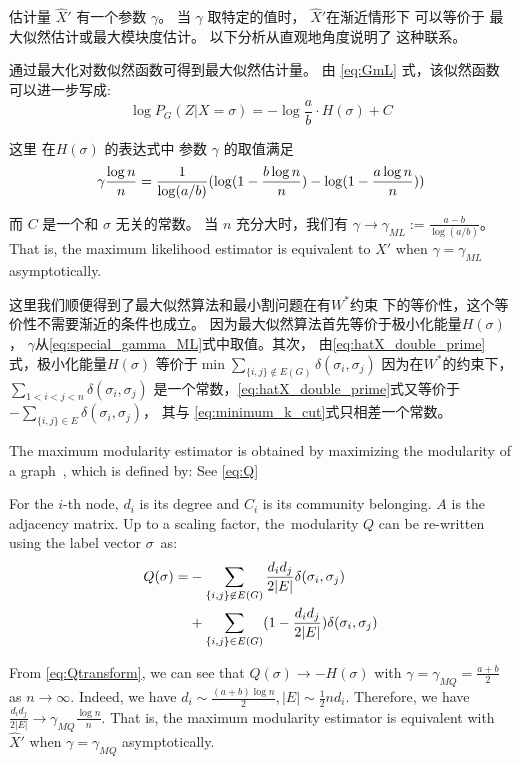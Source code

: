 估计量 $\hat{X}'$ 有一个参数 $\gamma$。
当 $\gamma$ 取特定的值时， $\hat{X}'$在渐近情形下
可以等价于 最大似然估计或最大模块度估计。
以下分析从直观地角度说明了
这种联系。

通过最大化对数似然函数可得到最大似然估计量。
由 \eqref{eq:GmL} 式，该似然函数可以进一步写成:
\begin{equation}\label{eq:PG_energy}
	\log P_G(Z|X=\sigma) = -\log\frac{a}{b} \cdot H(\sigma) + C
\end{equation}

这里 在$H(\sigma)$ 的表达式中 参数 $\gamma$ 的取值满足
\begin{equation}\label{eq:special_gamma_ML}
	\gamma \frac{\log n}{n} = \frac{1}{\log(a/b)}(\log (1-\frac{b \log n}{n}) - \log (1-\frac{a \log n}{n}))	 
\end{equation}

而 $C$ 是一个和 $\sigma$ 无关的常数。
当 $n$ 充分大时，我们有 $\gamma \to \gamma_{ML} := \frac{a-b}{\log(a/b)}$。   
That is, the  maximum likelihood estimator is equivalent to $\hat{X}'$ when $\gamma = \gamma_{ML}$ asymptotically.

这里我们顺便得到了最大似然算法和最小割问题在有$W^*$约束
下的等价性，这个等价性不需要渐近的条件也成立。
因为最大似然算法首先等价于极小化能量$H(\sigma)$，
$\gamma$从\eqref{eq:special_gamma_ML}式中取值。其次，
由\eqref{eq:hatX_double_prime}式，极小化能量$H(\sigma)$
等价于$\min \sum_{\{i,j\} \not\in E(G) } \delta(\sigma_i, \sigma_j)$
因为在$W^*$的约束下，
$\sum_{1<i<j<n} \delta(\sigma_i, \sigma_j)$
是一个常数，\eqref{eq:hatX_double_prime}式又等价于
$-\sum_{ \{i,j\} \in E} \delta(\sigma_i, \sigma_j)$，
其与 \eqref{eq:minimum_k_cut}式只相差一个常数。

The maximum modularity estimator is obtained by maximizing the modularity of a graph~\cite{clauset2004finding}, which is defined by:
See \ref{eq:Q}

For the $i$-th node, $d_i$ is its degree and $C_i$ is its community belonging. $A$ is the adjacency matrix.
Up to a scaling factor, the~modularity $Q$ can be re-written using the label vector $\sigma$~as:
\begin{align}
Q(\sigma) = &-\sum_{\{i,j\} \not\in E(G) } \frac{d_i d_j}{2 |E|}\delta(\sigma_i,\sigma_j) \notag \\
&+ \sum_{\{i,j\} \in E(G) } (1 - \frac{d_i d_j}{2 |E|}) \delta(\sigma_i,\sigma_j)  \label{eq:Qtransform}
\end{align}

From \eqref{eq:Qtransform}, we can see that $Q(\sigma) \to -H(\sigma)$ with $\gamma = \gamma_{MQ} = \frac{a+b}{2}$ as $n\to \infty$.
Indeed, we have $d_i \sim \frac{(a+b)\log n}{2}, |E| \sim \frac{1}{2}n d_i$. Therefore, we have $\frac{d_id_j}{2|E|} \to \gamma_{MQ} \frac{\log n}{n} $. That is, the maximum modularity estimator is equivalent with $\hat{X}'$ when $\gamma = \gamma_{MQ}$ asymptotically.


